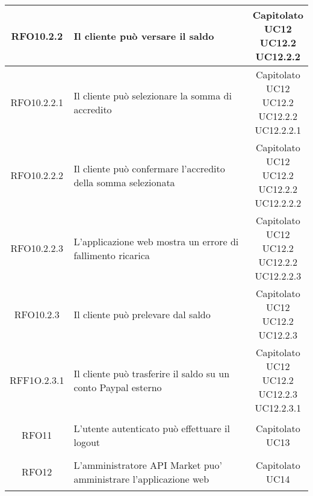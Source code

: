 \begin{longtable}{|c|p{8cm}|c|}
\hypertarget{RFO10.2.2}{RFO10.2.2} &  Il cliente può versare il saldo & \makecell*{Capitolato\\UC12\\UC12.2\\UC12.2.2} \\
\hline

\hypertarget{RFO10.2.2.1}{RFO10.2.2.1} &  Il cliente può selezionare la somma di accredito & \makecell*{Capitolato\\UC12\\UC12.2\\UC12.2.2\\UC12.2.2.1} \\
\hline

\hypertarget{RFO10.2.2.2}{RFO10.2.2.2} &  Il cliente può confermare l'accredito della somma selezionata & \makecell*{Capitolato\\UC12\\UC12.2\\UC12.2.2\\UC12.2.2.2} \\
\hline

\hypertarget{RFO10.2.2.3}{RFO10.2.2.3} &  L'applicazione web mostra un errore di fallimento ricarica & \makecell*{Capitolato\\UC12\\UC12.2\\UC12.2.2\\UC12.2.2.3} \\
\hline

\hypertarget{RFO10.2.3}{RFO10.2.3} &  Il cliente può prelevare dal saldo & \makecell*{Capitolato\\UC12\\UC12.2\\UC12.2.3} \\
\hline

\hypertarget{RFF10.2.3.1}{RFF1O.2.3.1} &  Il cliente può trasferire il saldo su un conto Paypal esterno & \makecell*{Capitolato\\UC12\\UC12.2\\UC12.2.3\\UC12.2.3.1} \\
\hline

\hypertarget{RFO11}{RFO11} & L'utente autenticato può effettuare il logout & \makecell*{Capitolato\\UC13} \\
\hline

\hypertarget{RFO12}{RFO12} &  L'amministratore API Market puo' amministrare l'applicazione web & \makecell*{Capitolato\\UC14} \\
\hline


\end{longtable}
